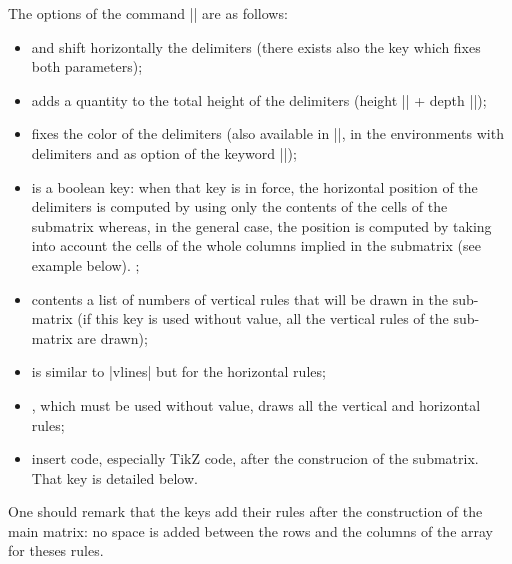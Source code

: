 \documentclass[dvipsnames]{article}%
\begin{document}
\bigskip
The options of the command |\SubMatrix| are as follows:
\begin{itemize}
\item 
{}
 and  shift
horizontally the delimiters (there exists also the key 
which fixes both parameters);
\item {}
 adds a quantity to the total height of the
delimiters (height |\ht| + depth |\dp|);
\item {}
 fixes the color of the delimiters (also
available in |\NiceMatrixOptions|, in the environments with delimiters and as
option of the keyword |\CodeAfter|);
\item {}
 is a boolean key: when that key is in force, the horizontal
position of the delimiters is computed by using only the contents of the cells
of the submatrix whereas, in the general case, the position is computed by
taking into account the cells of the whole columns implied in the submatrix
(see example below). ;
\item {}
 contents a list of numbers of vertical rules that
will be drawn in the sub-matrix (if this key is used without value, all the
vertical rules of the sub-matrix are drawn);
\item {}
 is similar to |vlines| but for the horizontal rules;
\item {}
, which must be used without value, draws all the
vertical and horizontal rules;
\item {}
 insert code, especially TikZ code, after the
construcion of the submatrix. That key is detailed below.
\end{itemize}
One should remark that the keys add their rules after the construction of
the main matrix: no space is added between the rows and the columns of the
array for theses rules.
\end{document}
